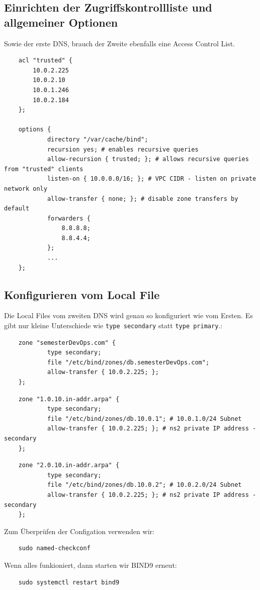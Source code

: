 \documentclass[a4paper,12pt]{article}
\begin{document}
\subsection{Einrichten der Zugriffskontrollliste und allgemeiner Optionen}  

Sowie der erste DNS, brauch der Zweite ebenfalls eine Access Control List.
\begin{verbatim}
	acl "trusted" {
		10.0.2.225
		10.0.2.10
		10.0.1.246
		10.0.2.184
	};

	options {
			directory "/var/cache/bind";
			recursion yes; # enables recursive queries
			allow-recursion { trusted; }; # allows recursive queries from "trusted" clients
			listen-on { 10.0.0.0/16; }; # VPC CIDR - listen on private network only
			allow-transfer { none; }; # disable zone transfers by default
			forwarders {
				8.8.8.8;
				8.8.4.4;
			};
			...
	};
\end{verbatim}


\subsection{Konfigurieren vom Local File}
Die Local Files vom zweiten DNS wird genau so konfiguriert wie vom Ersten. 
Es gibt nur kleine Unterschiede wie \texttt{type secondary} statt \texttt{type primary}.: 


\begin{verbatim}
	zone "semesterDevOps.com" {
			type secondary;
			file "/etc/bind/zones/db.semesterDevOps.com"; 
			allow-transfer { 10.0.2.225; };
	};
\end{verbatim}


\begin{verbatim}
	zone "1.0.10.in-addr.arpa" {
			type secondary;
			file "/etc/bind/zones/db.10.0.1"; # 10.0.1.0/24 Subnet
			allow-transfer { 10.0.2.225; }; # ns2 private IP address - secondary
	};
\end{verbatim}


\begin{verbatim}
	zone "2.0.10.in-addr.arpa" {
			type secondary;
			file "/etc/bind/zones/db.10.0.2"; # 10.0.2.0/24 Subnet
			allow-transfer { 10.0.2.225; }; # ns2 private IP address - secondary
	};
\end{verbatim}

Zum Überprüfen der Configation verwenden wir:
\begin{verbatim}
	sudo named-checkconf
\end{verbatim}

Wenn alles funkioniert, dann starten wir BIND9 erneut:
\begin{verbatim}
	sudo systemctl restart bind9
\end{verbatim}
\end{document}
